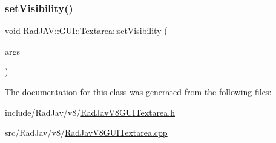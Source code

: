 \mbox{\label{class_rad_j_a_v_1_1_g_u_i_1_1_textarea_a6e83ab22c241312ba6efecbb66ec79c9}} 
\subsubsection{\texorpdfstring{set\+Visibility()}{setVisibility()}}
{\footnotesize\ttfamily void Rad\+J\+A\+V\+::\+G\+U\+I\+::\+Textarea\+::set\+Visibility (\begin{DoxyParamCaption}\item[{const v8\+::\+Function\+Callback\+Info$<$ v8\+::\+Value $>$ \&}]{args }\end{DoxyParamCaption})\hspace{0.3cm}{\ttfamily [static]}}



The documentation for this class was generated from the following files\+:\begin{DoxyCompactItemize}
\item 
include/\+Rad\+Jav/v8/\mbox{\hyperlink{_rad_jav_v8_g_u_i_textarea_8h}{Rad\+Jav\+V8\+G\+U\+I\+Textarea.\+h}}\item 
src/\+Rad\+Jav/v8/\mbox{\hyperlink{_rad_jav_v8_g_u_i_textarea_8cpp}{Rad\+Jav\+V8\+G\+U\+I\+Textarea.\+cpp}}\end{DoxyCompactItemize}
